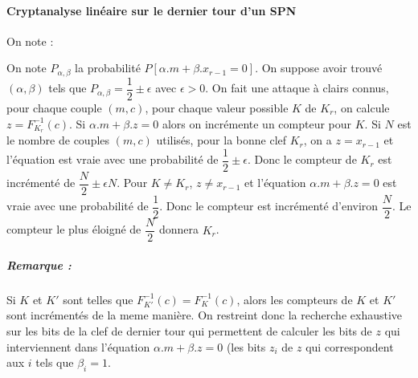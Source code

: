 \documentclass[12pt,a4paper]{report}
\begin{document}
\paragraph{Cryptanalyse linéaire sur le dernier tour d'un SPN\\}
On note :
\begin{center}
  \scalebox{0.8}{}	
\end{center}
On note $P_{\alpha,\beta}$ la probabilité $P[\alpha.m+\beta.x_{r-1}=0]$. On suppose avoir trouvé $(\alpha,\beta)$ tels que $P_{\alpha,\beta} = \dfrac{1}{2} \pm \epsilon$ avec $\epsilon > 0$. On fait une attaque à clairs connus, pour chaque couple $(m,c)$, pour chaque valeur possible $K$ de $K_r$, on calcule $z=F^{-1}_{K_r} (c) $. Si $\alpha.m + \beta.z = 0$ alors on incrémente un compteur pour $K$. Si $N$ est le nombre de couples $(m,c)$ utilisés, pour la bonne clef $K_r$, on a $z=x_{r-1}$ et l'équation est vraie avec une probabilité de $\dfrac{1}{2} \pm \epsilon$. Donc le compteur de $K_r$ est incrémenté de $\dfrac{N}{2} \pm \epsilon N$. Pour $K\neq K_r$, $z \neq x_{r-1}$ et l'équation $\alpha.m + \beta.z = 0$ est vraie avec une probabilité de $\dfrac{1}{2}$. Donc le compteur est incrémenté d'environ $\dfrac{N}{2}$. Le compteur le plus éloigné de $\dfrac{N}{2}$ donnera $K_r$.
\subparagraph{Remarque :} Si $K$ et $K'$ sont telles que $F^{-1}_{K'} (c) = F^{-1}_{K} (c)$, alors les compteurs de $K$ et $K'$ sont incrémentés de la meme manière. On restreint donc la recherche exhaustive sur les bits de la clef de dernier tour qui permettent de calculer les bits de $z$ qui interviennent dans l'équation $\alpha.m + \beta.z = 0$ (les bits $z_i$ de $z$ qui correspondent aux $i$ tels que $\beta_i=1$.
\end{document}

